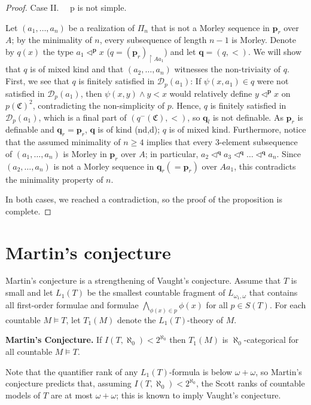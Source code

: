 \documentclass{amsart}
\theoremstyle{definition}
\theoremstyle{definition}
\def\strok{\restriction}
\newcommand{\Mon}{\mathfrak C}
\begin{document}
\begin{proof}
Case II. \ \  p is not simple.

Let $(a_1,\dots,a_n)$ be a realization of $\Pi_n$ that is not a Morley sequence in $\mathbf p_r$ over $A$; by the minimality of $n$, every subsequence of length $n-1$ is Morley. Denote by $q(x)$ the type $a_1\triangleleft^{\mathbf p} x$ ($q=(\mathbf p_r)_{\strok Aa_1}$) and let $\mathbf q=(q,<)$. We will show that $q$ is of mixed kind and that $(a_2,\dots,a_n)$ witnesses the non-triviaity of $q$.
First, we see that $q$ is finitely satisfied in $\mathcal D_p(a_1)$: If $\psi(x,a_1)\in q$ were not satisfied in $\mathcal D_p(a_1)$, then $\psi(x,y)\land y<x$ would relatively define $y\triangleleft^{\mathbf p}x$ on $p(\Mon)^2$, contradicting the non-simplicity of $p$. Hence, $q$ is finitely satisfied in $\mathcal D_p(a_1)$, which is a final part of $(q^-(\Mon),<)$, so $\mathbf q_l$ is not definable. As $\mathbf p_r$ is definable and $\mathbf q_r=\mathbf p_r$, $\mathbf q$ is of kind (nd,d); $q$ is of mixed kind. Furthermore, notice that the assumed minimality of $n\geqslant 4$ implies that every 3-element subsequence of $(a_1,\dots,a_n)$ is Morley in $\mathbf p_r$ over $A$; in particular, $a_2\triangleleft^{\mathbf q}a_3\triangleleft^{\mathbf q}\dots\triangleleft^{\mathbf q}a_n$. Since $(a_2,\dots,a_n)$ is not a Morley sequence in $\mathbf q_r(=\mathbf p_r)$ over $Aa_1$, this contradicts the minimality property of $n$.   

In both cases, we reached a contradiction, so the proof of the proposition is complete.  
\end{proof}

  
 



\section{Martin's conjecture}\label{Section Martin}

Martin's conjecture is a strengthening of Vaught's conjecture. Assume that $T$ is small and let $L_1(T)$ be the smallest countable fragment of $L_{\omega_1,\omega}$ that contains all first-order formulae and formulae $\bigwedge_{\phi(x)\in p}\phi(x)$ for all $p\in S(T)$. For each countable $M\models T$, let $T_1(M)$ denote the $L_1(T)$-theory of $M$.


\smallskip
 {\bf Martin's Conjecture.} If $I(T,\aleph_0)<2^{\aleph_0}$ then $T_1(M)$ is $\aleph_0$-categorical for all countable $M\models T$.

\smallskip
Note that the quantifier rank of any $L_1(T)$-formula is below $\omega+\omega$, so  Martin's conjecture predicts that, assuming $I(T,\aleph_0)<2^{\aleph_0}$, the Scott ranks of countable models of $T$ are at most $\omega+\omega$; this is known to imply Vaught's conjecture. 
 
\end{document}
